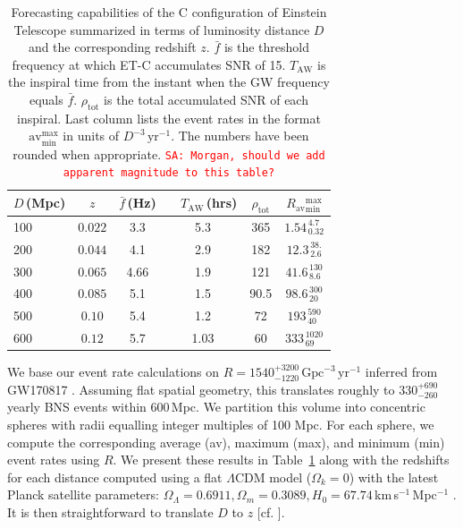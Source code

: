 \documentclass{aa}
\newcommand\T{\rule{0pt}{2.6ex}}       %
\newcommand\B{\rule[-1.2ex]{0pt}{0pt}} %
\newcommand{\sa}[1]{{\textcolor{red}{\texttt{SA: #1}} }}
\begin{document}
%
%
%
%
\begin{table}[h]
\caption{Forecasting capabilities of the C configuration of Einstein Telescope summarized in terms
of luminosity distance $D$ and the corresponding redshift $z$.
$\bar{f}$ is the threshold frequency at which ET-C accumulates SNR of 15.
$T_\text{AW}$ is the inspiral time from the instant when the GW frequency equals $\bar{f}$.
$\rho_\text{tot}$ is the total accumulated SNR of each inspiral.
Last column lists the event rates in the format $\text{av}^\text{max}_\text{min}$ in units of $D^{-3}\,\text{yr}^{-1}$.
The numbers have been rounded when appropriate.
\sa{Morgan, should we add apparent magnitude to this table?}}
\label{table:ET}
\centering
\begin{tabular}{lccccc}
\hline\hline
$D\,$(Mpc) &  $z$ & $\bar{f}\,$(Hz) & \ \hspace{1mm} $T_\text{AW}\,$(hrs)& ${\rho}_\text{tot}$ &$ R_\text{av}{}^\text{max}_\text{min}$ \T\B \\
\hline
100 & $ 0.022$ & 3.3 & 5.3 & 365 & $1.54^{\,4.7}_{\,0.32}$\T\B \\
200 & $ 0.044$ & 4.1 & 2.9 & 182 & $12.3^{\,38.}_{\,2.6}$ \T \B \\
300 & $ 0.065$ & 4.66 & 1.9 & 121 & $41.6^{\,130}_{\,8.6}$ \T \B \\
400 & $ 0.085$ & 5.1 & 1.5 & 90.5 & $98.6^{\,300}_{\,20}$ \T \B \\
500 & $ 0.10$ & 5.4 & 1.2 & 72 & $193^{\,590}_{\,40}$ \T \B \\
600 & $ 0.12$ & 5.7 & 1.03 & 60 & $333^{\,1020}_{\,69}$ \T \B \\
\hline\hline
\end{tabular}
\end{table}
%
%
%
%
%

We base our event rate calculations on $R=1540^{+3200}_{-1220}\,\text{Gpc}^{-3}\,\text{yr}^{-1}$ inferred from GW170817 \citep{GW170817}. Assuming flat spatial geometry, this translates roughly to $330^{+690}_{-260}$ yearly BNS events within 600\,Mpc. We partition this volume into concentric spheres with radii equalling integer multiples of 100 Mpc. For each sphere, we compute the corresponding average (av), maximum (max), and minimum (min) event rates using $R$. We present these results in Table~\ref{table:ET} along with the redshifts for
each distance computed using a flat $\Lambda$CDM model ($\Omega_k=0$) with the latest Planck satellite parameters: 
$\Omega_\Lambda = 0.6911, \Omega_m = 0.3089, H_0 = 67.74\,$km\,s$^{-1}\,$Mpc$^{-1}$ \citep{Planck2015}. %
It is then straightforward to translate $D$ to $z$ [cf. \cite{Hogg:1999ad}].
\end{document}

